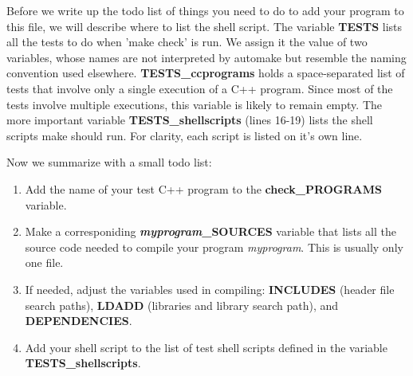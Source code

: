 Before we write up the todo list of things you need to do to add your
program to this file, we will describe where to list the shell script.  
%    
The variable \textbf{TESTS} lists all the tests to do when 'make
check' is run. We assign it the value of two variables, whose names
are not interpreted by automake but resemble the naming convention
used elsewhere. \textbf{TESTS\_ccprograms} holds a space-separated
list of tests that involve only a single execution of a C++
program. Since most of the tests involve multiple executions, this
variable is likely to remain empty. The more important variable
\textbf{TESTS\_shellscripts} (lines 16-19) lists the shell scripts make
should run. For clarity, each script is listed on it's own line.

Now we summarize with a small todo list:
\begin{enumerate}
  \item Add the name of your test C++ program to the
    \textbf{check\_PROGRAMS} variable. 
  \item Make a corresponiding \textbf{\emph{myprogram}\_SOURCES}
    variable that lists all the source code needed to compile your
    program \emph{myprogram}. This is usually only one file. 
  \item If needed, adjust the variables used in compiling:
    \textbf{INCLUDES} (header file 
    search paths), \textbf{LDADD} (libraries and library search path), and
    \textbf{DEPENDENCIES}.
  \item Add your shell script to the list of test shell scripts
    defined in the variable \textbf{TESTS\_shellscripts}.
\end{enumerate}

